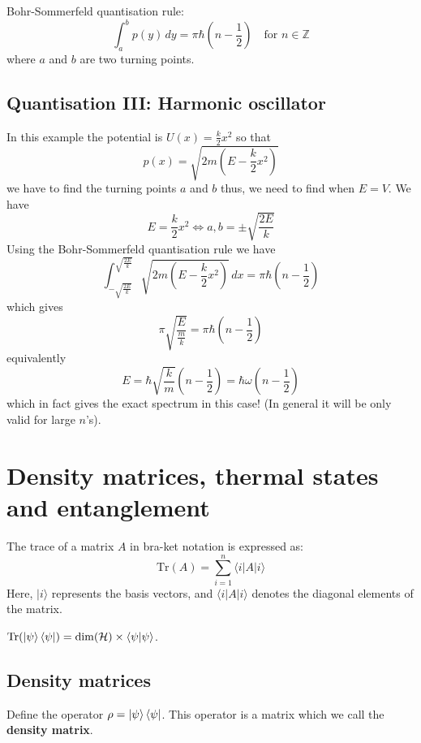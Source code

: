 \documentclass[12pt, a4paper]{article}
\begin{document}
\begin{mdprop}
    Bohr-Sommerfeld quantisation rule:
    \[\int_{a}^{b} p(y)\, dy = \pi\hbar\left(n - \frac{1}{2}\right) \quad \text{for } n \in \mathbb{Z}\]
    where \( a \) and \( b \) are two turning points.
\end{mdprop}

\subsection{Quantisation III: Harmonic oscillator}

In this example the potential is \( U(x) = \frac{k}{2}x^2 \) so that 
\[ p(x) = \sqrt{2m\left(E - \frac{k}{2}x^2\right)}\] 
we have to find the turning points \( a \) and \( b \) thus, we need to find when \(E=V\). We have
\[E = \frac{k}{2}x^2 \iff a, b = \pm\sqrt{\frac{2E}{k}}\]
Using the Bohr-Sommerfeld quantisation rule we have
\[
\int_{-\sqrt{\frac{2E}{k}}}^{\sqrt{\frac{2E}{k}}} \sqrt{2m \left( E - \frac{k}{2}x^2 \right)} \,dx = \pi\hbar\left(n - \frac{1}{2}\right)
\]
which gives
\[
\pi\sqrt{\frac{E}{\frac{m}{k}}} = \pi\hbar\left(n - \frac{1}{2}\right)
\]
equivalently
\[
E = \hbar\sqrt{\frac{k}{m}}\left(n - \frac{1}{2}\right) = \hbar\omega\left(n - \frac{1}{2}\right)
\]
which in fact gives the exact spectrum in this case! (In general it will be only valid for large \( n\)'s).

\section{Density matrices, thermal states and entanglement}

\begin{mdprop}
    The trace of a matrix \( A \) in bra-ket notation is expressed as:
\[ \text{Tr}(A) = \sum_{i=1}^n \langle i | A | i \rangle \]
Here, \( | i \rangle \) represents the basis vectors, and \( \langle i | A | i \rangle \) denotes the diagonal elements of the matrix.
\end{mdprop}

\begin{mdprop}
    \(\text{Tr}(\ket{\psi}\bra{\psi})= \dim(\mathcal{H}) \times \bra{\psi}\ket{\psi}\).
\end{mdprop}

\subsection{Density matrices}

\begin{definition}
    Define the operator \(\rho=\ket{\psi}\bra{\psi}\). This operator is a matrix which we call the \textbf{density matrix}.
\end{definition}
\end{document}
